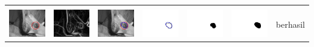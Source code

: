 \begin{table}[H]
\begin{tabular}{|m{0.7in}|m{0.7in}|m{0.7in}|m{0.7in}|m{0.7in}|m{0.7in}|m{0.7in}|}
		&  &  & & & &  \\
		\includegraphics[width=0.7in]{dataset/dataset_3/luka_hitam/ready/8_interp_init.jpg}&
		\includegraphics[width=0.7in]{dataset/dataset_3/luka_hitam/ready/8_interp_ext.jpg}&
		\includegraphics[width=0.7in]{dataset/dataset_3/luka_hitam/ready/8_interp_result.jpg}&
		\includegraphics[width=0.7in]{dataset/dataset_3/luka_hitam/ready/8_gt_r.jpg}&
		\includegraphics[width=0.7in]{dataset/dataset_3/luka_hitam/ready/8_r.jpg}&
		\includegraphics[width=0.7in]{dataset/dataset_3/luka_hitam/ready/8_interp_r.jpg}&
		berhasil\\
		\hline
		

\end{tabular}
\end{table}
